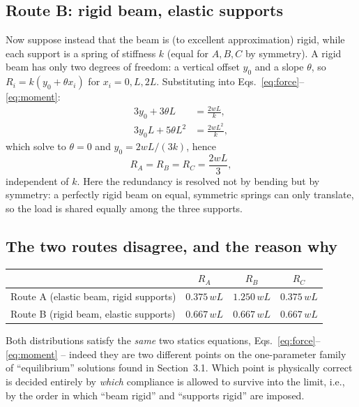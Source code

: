 \documentclass[11pt]{article}
\begin{document}
\subsection{Route B: rigid beam, elastic supports}

Now suppose instead that the beam is (to excellent approximation) rigid, while each support is a spring of stiffness $k$ (equal for $A,B,C$ by symmetry). A rigid beam has only two degrees of freedom: a vertical offset $y_0$ and a slope $\theta$, so $R_i = k(y_0+\theta x_i)$ for $x_i=0,L,2L$. Substituting into Eqs.~\eqref{eq:force}--\eqref{eq:moment}:
\begin{align}
3y_0+3\theta L &= \frac{2wL}{k}, \\
3y_0 L + 5\theta L^2 &= \frac{2wL^2}{k},
\end{align}
which solve to $\theta=0$ and $y_0=2wL/(3k)$, hence
\begin{equation}
R_A=R_B=R_C = \frac{2wL}{3},
\label{eq:routeB}
\end{equation}
independent of $k$. Here the redundancy is resolved not by bending but by symmetry: a perfectly rigid beam on equal, symmetric springs can only translate, so the load is shared equally among the three supports.

\subsection{The two routes disagree, and the reason why}

\begin{center}
\begin{tabular}{@{}lccc@{}}
\toprule
& $R_A$ & $R_B$ & $R_C$ \\
\midrule
Route A (elastic beam, rigid supports) & $0.375\,wL$ & $1.250\,wL$ & $0.375\,wL$ \\
Route B (rigid beam, elastic supports) & $0.667\,wL$ & $0.667\,wL$ & $0.667\,wL$ \\
\bottomrule
\end{tabular}
\end{center}

Both distributions satisfy the \emph{same} two statics equations, Eqs.~\eqref{eq:force}--\eqref{eq:moment} -- indeed they are two different points on the one-parameter family of ``equilibrium'' solutions found in Section~3.1. Which point is physically correct is decided entirely by \emph{which} compliance is allowed to survive into the limit, i.e., by the order in which ``beam rigid'' and ``supports rigid'' are imposed.
\end{document}
